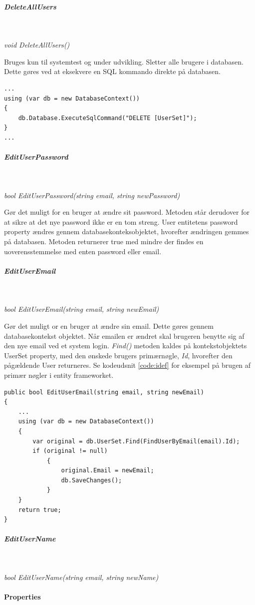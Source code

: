 \subparagraph{DeleteAllUsers}\

\textit{void DeleteAllUsers()}

Bruges kun til systemtest og under udvikling.
Sletter alle brugere i databasen. Dette gøres ved at eksekvere en SQL kommando direkte på databasen. 

\begin{lstlisting}[caption=SQL injection på databasen ved sletning af brugere, label=sqlDeleteUsers]
...
using (var db = new DatabaseContext())
{
	db.Database.ExecuteSqlCommand("DELETE [UserSet]");
}
...	
\end{lstlisting}

\subparagraph{EditUserPassword}\

\textit{bool EditUserPassword(string email, string newPassword)}

Gør det muligt for en bruger at ændre sit password. Metoden står derudover for at sikre at det nye password ikke er en tom streng. User entitetens password property ændres gennem databasekonteksobjektet, hvorefter ændringen gemmes på databasen.
Metoden returnerer true med mindre der findes en uoverensstemmelse med enten password eller email.

\subparagraph{EditUserEmail}\

\textit{bool EditUserEmail(string email, string newEmail)}

Gør det muligt or en bruger at ændre sin email. Dette gøres gennem databasekontekst objektet. Når emailen er ændret skal brugeren benytte sig af den nye email ved et system login. \textit{Find()} metoden kaldes på kontekstobjektets UserSet property, med den ønskede brugers primærnøgle, \textit{Id}, hvorefter den pågældende User returneres. Se kodeudsnit \ref{code:idef} for eksempel på brugen af primær nøgler i entity frameworket.

\begin{lstlisting}[caption=EditUserEmail - brug af primær nøgler i Entity Framework,label=code:idef]
public bool EditUserEmail(string email, string newEmail)
{
	...
	using (var db = new DatabaseContext())
	{
		var original = db.UserSet.Find(FindUserByEmail(email).Id);
		if (original != null)
			{
				original.Email = newEmail;
				db.SaveChanges();
			}
	}
	return true;
}

\end{lstlisting}

\subparagraph{EditUserName}\

\textit{bool EditUserName(string email, string newName)}

\paragraph{Properties}\